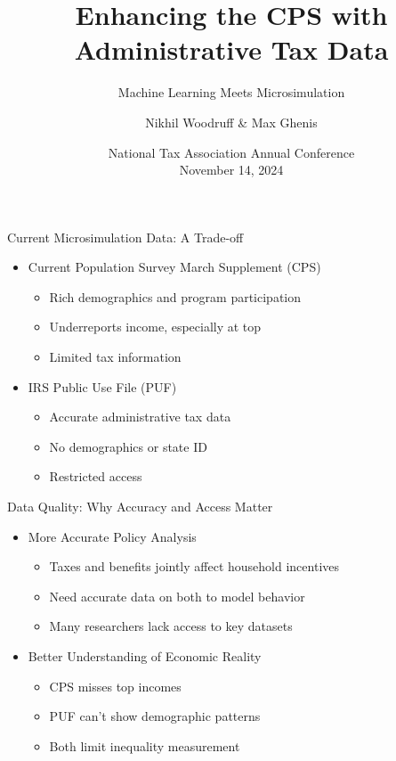 \documentclass{beamer}
\title{Enhancing the CPS with Administrative Tax Data}
\subtitle{Machine Learning Meets Microsimulation}
\author[Woodruff \& Ghenis]{Nikhil Woodruff \& Max Ghenis}
\institute{PolicyEngine}
\date{National Tax Association Annual Conference\\November 14, 2024}
\begin{document}
\begin{frame}
    \titlepage
\end{frame}

\begin{frame}{Current Microsimulation Data: A Trade-off}
    \begin{itemize}
        \item Current Population Survey March Supplement (CPS)
        \begin{itemize}
            \item Rich demographics and program participation
            \item Underreports income, especially at top
            \item Limited tax information
        \end{itemize}
        \pause
        \item IRS Public Use File (PUF)
        \begin{itemize}
            \item Accurate administrative tax data
            \item No demographics or state ID
            \item Restricted access
        \end{itemize}
    \end{itemize}
\end{frame}

\begin{frame}{Data Quality: Why Accuracy and Access Matter}
    \begin{itemize}
        \item More Accurate Policy Analysis
        \begin{itemize}
            \item Taxes and benefits jointly affect household incentives
            \item Need accurate data on both to model behavior
            \item Many researchers lack access to key datasets
        \end{itemize}
        \pause
        \item Better Understanding of Economic Reality
        \begin{itemize}
            \item CPS misses top incomes
            \item PUF can't show demographic patterns
            \item Both limit inequality measurement
        \end{itemize}
    \end{itemize}
\end{frame}
\end{document}
